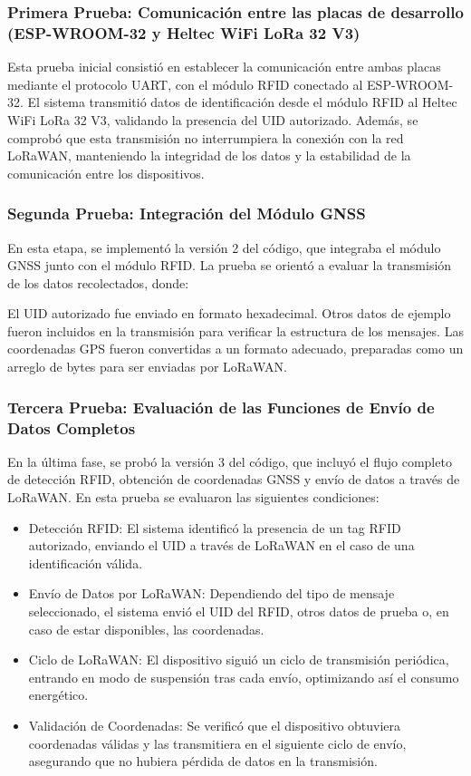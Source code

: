 \subsubsection {Primera Prueba: Comunicación entre las placas de desarrollo (ESP-WROOM-32 y Heltec WiFi LoRa 32 V3)}
Esta prueba inicial consistió en establecer la comunicación entre ambas placas mediante el protocolo UART, con el módulo RFID conectado al ESP-WROOM-32. El sistema transmitió datos de identificación desde el módulo RFID al Heltec WiFi LoRa 32 V3, validando la presencia del UID autorizado. Además, se comprobó que esta transmisión no interrumpiera la conexión con la red LoRaWAN, manteniendo la integridad de los datos y la estabilidad de la comunicación entre los dispositivos.

\subsubsection {Segunda Prueba: Integración del Módulo GNSS}
En esta etapa, se implementó la versión 2 del código, que integraba el módulo GNSS junto con el módulo RFID. La prueba se orientó a evaluar la transmisión de los datos recolectados, donde:

El UID autorizado fue enviado en formato hexadecimal.
Otros datos de ejemplo fueron incluidos en la transmisión para verificar la estructura de los mensajes.
Las coordenadas GPS fueron convertidas a un formato adecuado, preparadas como un arreglo de bytes para ser enviadas por LoRaWAN.
\subsubsection {Tercera Prueba: Evaluación de las Funciones de Envío de Datos Completos}
En la última fase, se probó la versión 3 del código, que incluyó el flujo completo de detección RFID, obtención de coordenadas GNSS y envío de datos a través de LoRaWAN. En esta prueba se evaluaron las siguientes condiciones:
\begin{itemize}
\item Detección RFID: El sistema identificó la presencia de un tag RFID autorizado, enviando el UID a través de LoRaWAN en el caso de una identificación válida.
\item Envío de Datos por LoRaWAN: Dependiendo del tipo de mensaje seleccionado, el sistema envió el UID del RFID, otros datos de prueba o, en caso de estar disponibles, las coordenadas.
\item Ciclo de LoRaWAN: El dispositivo siguió un ciclo de transmisión periódica, entrando en modo de suspensión tras cada envío, optimizando así el consumo energético.
\item Validación de Coordenadas: Se verificó que el dispositivo obtuviera coordenadas válidas y las transmitiera en el siguiente ciclo de envío, asegurando que no hubiera pérdida de datos en la transmisión.
\end{itemize}

